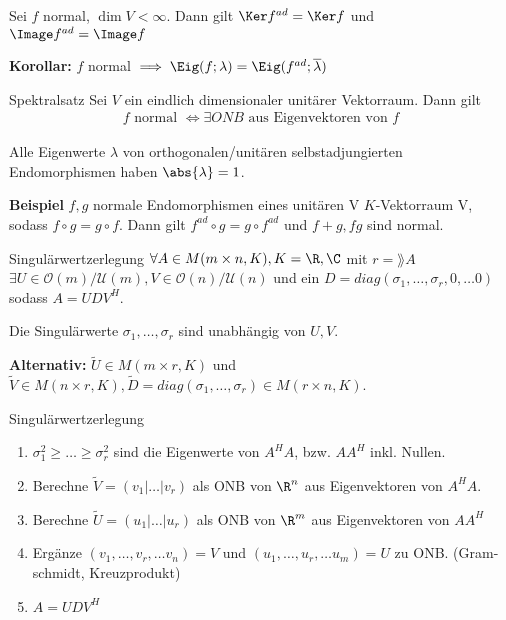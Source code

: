 \begin{nosatz}{}
    Sei $f$ normal, $\dim V < \infty$.
    Dann gilt $\Ker f^{ad} = \Ker f$ und $\Image f^{ad} = \Image f$
\end{nosatz}
\textbf{Korollar:} \quad $f$ normal $\implies \Eig(f;\lambda) = \Eig(f^{ad};\overline{\lambda})$

\begin{nosatz}{Spektralsatz}
    Sei $V$ ein eindlich dimensionaler unitärer Vektorraum. Dann gilt 
    \begin{align*}
        f \text{ normal } \Leftrightarrow \exists ONB \text{ aus Eigenvektoren von $f$}
    \end{align*}
\end{nosatz}


Alle Eigenwerte $\lambda$ von orthogonalen/unitären  selbstadjungierten Endomorphismen haben $\abs{\lambda} = 1$.

\textbf{Beispiel} \quad $f,g$ normale Endomorphismen eines unitären V
$K$-Vektorraum V, sodass $f \circ g = g \circ f$. Dann gilt $f^{ad} \circ g = g \circ f^{ad}$ und $f + g, fg$ sind normal.


\begin{nosatz}{Singulärwertzerlegung}
    $\forall A \in M(m\times n,K), K = \R, \C$ mit $r = \rang A$ $\exists U \in \mathcal{O}(m)/ \mathcal{U}(m), V \in \mathcal{O}(n)/ \mathcal{U}(n)$ und ein $D = diag(\sigma_{1}, \ldots, \sigma_{r}, 0, \ldots 0)$ sodass $A = UDV^H$.

    Die Singulärwerte $\sigma_{1}, \ldots, \sigma_{r}$ sind unabhängig von $U,V$.

    \textbf{Alternativ:} \quad $\tilde{U} \in M(m\times r,K)$ und $\tilde{V} \in M(n\times r,K), \tilde{D} = diag(\sigma_{1}, \ldots, \sigma_{r}) \in M(r\times n,K)$.
\end{nosatz}

\begin{rezept}{Singulärwertzerlegung}
    \begin{enumerate}[{(}i{)}]
        \item   $\sigma_1^2 \geq \ldots \geq \sigma_r^2$ sind die Eigenwerte von $A^HA$, bzw. $AA^H$ inkl. Nullen.
        \item   Berechne $\tilde{V} = (v_1| \ldots | v_r)$ als ONB von $\R^n$ aus Eigenvektoren von $A^HA$.
        \item   Berechne $\tilde{U} = (u_1| \ldots | u_r)$ als ONB von $\R^m$ aus Eigenvektoren von $AA^H$
        \item   Ergänze $(v_{1}, \ldots, v_{r}, \ldots v_n) = V$ und $(u_{1}, \ldots, u_{r}, \ldots u_m) = U$ zu ONB. (Gram-schmidt, Kreuzprodukt)
        \item   $A = U D V^H$ 
    \end{enumerate}
\end{rezept}

